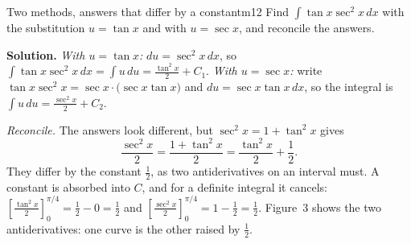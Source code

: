 \documentclass[11pt]{article}
\begin{document}
\begin{exmp}{Two methods, answers that differ by a constant}{m12}
Find $\int\tan x\sec^2x\,dx$ with the substitution $u=\tan x$ and with $u=\sec x$, and reconcile the answers.

\textbf{Solution.} \emph{With $u=\tan x$:} $du=\sec^2x\,dx$, so $\int\tan x\sec^2x\,dx=\int u\,du=\frac{\tan^2x}2+C_1$. \emph{With $u=\sec x$:} write $\tan x\sec^2x=\sec x\cdot\big(\sec x\tan x\big)$ and $du=\sec x\tan x\,dx$, so the integral is $\int u\,du=\frac{\sec^2x}2+C_2$.

\emph{Reconcile.} The answers look different, but $\sec^2x=1+\tan^2x$ gives
\[\frac{\sec^2x}2=\frac{1+\tan^2x}2=\frac{\tan^2x}2+\frac12 .\]
They differ by the constant $\frac12$, as two antiderivatives on an interval must. A constant is absorbed into $C$, and for a definite integral it cancels: $\left[\frac{\tan^2x}2\right]_0^{\pi/4}=\frac12-0=\frac12$ and $\left[\frac{\sec^2x}2\right]_0^{\pi/4}=1-\frac12=\frac12$. Figure~3 shows the two antiderivatives: one curve is the other raised by $\frac12$.


\end{exmp}
\end{document}
